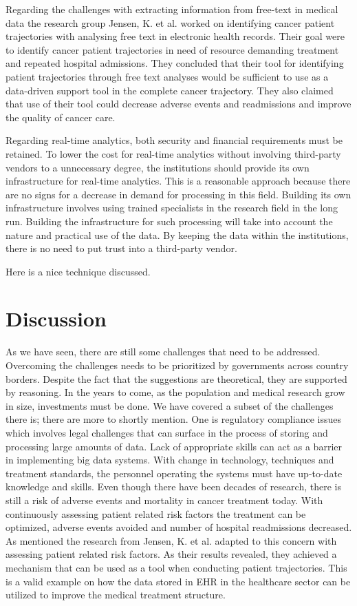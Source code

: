 Regarding the challenges with extracting information from free-text in medical data the research group Jensen, K. et al.\cite{freetext} worked on identifying cancer patient trajectories with analysing free text in electronic health records. Their goal were to identify cancer patient trajectories in need of resource demanding treatment and repeated hospital admissions. They concluded that their tool for identifying patient trajectories through free text analyses would be sufficient to use as a data-driven support tool in the complete cancer trajectory. They also claimed that use of their tool could decrease adverse events and readmissions and improve the quality of cancer care. 

Regarding real-time analytics, both security and financial requirements must be retained. To lower the cost for real-time analytics without involving third-party vendors to a unnecessary degree, the institutions should provide its own infrastructure for real-time analytics. This is a reasonable approach because there are no signs for a decrease in demand for processing in this field. Building its own infrastructure involves using trained specialists in the research field in the long run. Building the infrastructure for such processing will take into account the nature and practical use of the data. By keeping the data within the institutions, there is no need to put trust into a third-party vendor.

Here is a nice technique discussed.\cite{medicalmining}

\section{Discussion}
As we have seen, there are still some challenges that need to be addressed. Overcoming the challenges needs to be prioritized by governments across country borders. Despite the fact that the suggestions are theoretical, they are supported by reasoning. In the years to come, as the population and medical research grow in size, investments must be done. We have covered a subset of the challenges there is; there are more to shortly mention. One is regulatory compliance issues\cite{kek} which involves legal challenges that can surface in the process of storing and processing large amounts of data. Lack of appropriate skills can act as a barrier in implementing big data systems\cite{kek}. With change in technology, techniques and treatment standards, the personnel operating the systems must have up-to-date knowledge and skills.
Even though there have been decades of research, there is still a risk of adverse events and mortality in cancer treatment today. With continuously assessing patient related risk factors the treatment can be optimized, adverse events avoided and number of hospital readmissions decreased. As mentioned the research  from Jensen, K. et al. adapted to this concern with assessing patient related risk factors. As their results revealed, they achieved a mechanism that can be used as a tool when conducting patient trajectories. This is a valid example on how the data stored in EHR in the healthcare sector can be utilized to improve the medical treatment structure. 


